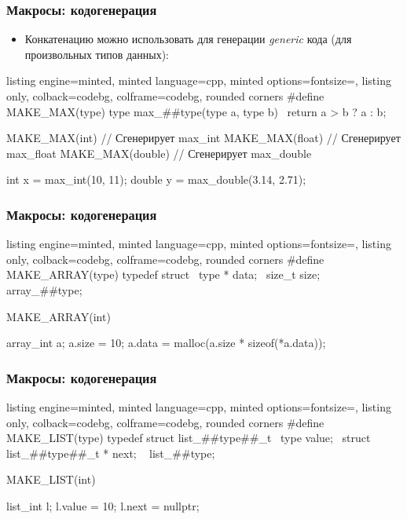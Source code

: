 \documentclass[10pt]{beamer}
\begin{document}
\begin{frame}[fragile]
\frametitle{Макросы: кодогенерация}
\begin{itemize}
\item Конкатенацию можно использовать для генерации \textit{generic} кода (для произвольных типов данных):
\end{itemize}
\begin{tcblisting}{listing engine=minted, minted language=cpp, minted options={fontsize=\scriptsize}, listing only, colback=codebg, colframe=codebg, rounded corners}
#define MAKE_MAX(type) type max_##type(type a, type b) { \
  return a > b ? a : b; }

MAKE_MAX(int)    // Сгенерирует max_int
MAKE_MAX(float)  // Сгенерирует max_float
MAKE_MAX(double) // Сгенерирует max_double

int x = max_int(10, 11);
double y = max_double(3.14, 2.71);
\end{tcblisting}
\end{frame}

\begin{frame}[fragile]
\frametitle{Макросы: кодогенерация}
\begin{tcblisting}{listing engine=minted, minted language=cpp, minted options={fontsize=\scriptsize}, listing only, colback=codebg, colframe=codebg, rounded corners}
#define MAKE_ARRAY(type) typedef struct { \
  type * data; \
  size_t size; \
  } array_##type;

MAKE_ARRAY(int)

array_int a;
a.size = 10;
a.data = malloc(a.size * sizeof(*a.data));
\end{tcblisting}
\end{frame}

\begin{frame}[fragile]
\frametitle{Макросы: кодогенерация}
\begin{tcblisting}{listing engine=minted, minted language=cpp, minted options={fontsize=\scriptsize}, listing only, colback=codebg, colframe=codebg, rounded corners}
#define MAKE_LIST(type) typedef struct list_##type##_t { \
  type value; \
  struct list_##type##_t * next; \
  } list_##type;

MAKE_LIST(int)

list_int l;
l.value = 10;
l.next = nullptr;
\end{tcblisting}
\end{frame}
\end{document}
